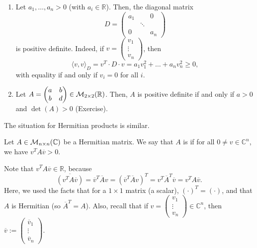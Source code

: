 \begin{example}
    \begin{enumerate}
        \item Let $a_1, \dots, a_n > 0$ (with $a_i \in \mathbb{R}$). Then, the diagonal matrix
        \begin{equation*}
            D = \begin{pmatrix} a_1 & & 0 \\ & \ddots & \\ 0 & & a_n \end{pmatrix}
        \end{equation*}
        is positive definite. Indeed, if $v = \begin{pmatrix} v_1 \\ \vdots \\ v_n \end{pmatrix}$, then
        \begin{equation*}
            \langle v, v \rangle_D = v^T \cdot D \cdot v = a_1 v_1^2 + \dots + a_n v_n^2 \geq 0,
        \end{equation*}
        with equality if and only if $v_i = 0$ for all $i$.
        \item Let $A = \begin{pmatrix} a & b \\ b & d \end{pmatrix} \in \mathcal{M}_{2 \times 2}(\mathbb{R})$. Then, $A$ is positive definite if and only if $a > 0$ and $\det(A) > 0$ (Exercise).
    \end{enumerate}
\end{example}

The situation for Hermitian products is similar.

\begin{definition}
    Let $A \in \mathcal{M}_{n \times n}(\mathbb{C})$ be a Hermitian matrix. We say that $A$ is  if for all $0 \neq v \in \mathbb{C}^n$, we have $v^T A \overline{v} > 0$. 
\end{definition}

\begin{remark}
    Note that $v^T A \overline{v} \in \mathbb{R}$, because
    \begin{equation*}
        \overline{(v^T A \overline{v})} = \overline{v}^T \overline{A} v = (\overline{v}^T \overline{A} v)^T = v^T \overline{A}^T \overline{v} = v^T A \overline{v}.
    \end{equation*}
    Here, we used the facts that for a $1 \times 1$ matrix (a scalar), $(\cdot)^T = (\cdot)$, and that $A$ is Hermitian (so $\overline{A}^T = A$). Also, recall that if $v = \begin{pmatrix} v_1 \\ \vdots \\ v_n \end{pmatrix} \in \mathbb{C}^n$, then $\overline{v} := \begin{pmatrix} \overline{v}_1 \\ \vdots \\ \overline{v}_n \end{pmatrix}$.
\end{remark}

